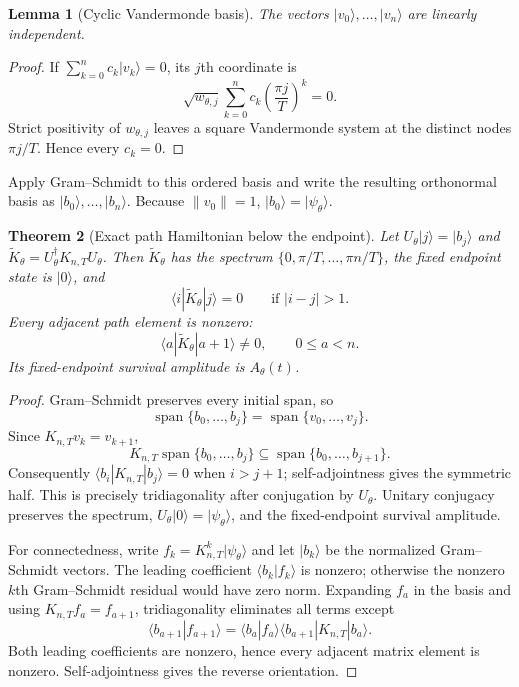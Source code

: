 \documentclass[12pt]{article}
\newtheorem{theorem}{Theorem}[section]
\newtheorem{lemma}[theorem]{Lemma}
\begin{document}
\begin{lemma}[Cyclic Vandermonde basis]
The vectors \(|v_0\rangle,\ldots,|v_n\rangle\) are linearly independent.
\end{lemma}

\begin{proof}
If \(\sum_{k=0}^{n}c_k|v_k\rangle=0\), its \(j\)th coordinate is
\[
 \sqrt{w_{\theta,j}}\sum_{k=0}^{n}
 c_k\left(\frac{\pi j}{T}\right)^k=0.
\]
Strict positivity of \(w_{\theta,j}\) leaves a square Vandermonde system
at the distinct nodes \(\pi j/T\). Hence every \(c_k=0\).
\end{proof}

Apply Gram--Schmidt to this ordered basis and write the resulting
orthonormal basis as \(|b_0\rangle,\ldots,|b_n\rangle\). Because
\(\|v_0\|=1\), \(|b_0\rangle=|\psi_\theta\rangle\).

\begin{theorem}[Exact path Hamiltonian below the endpoint]
Let \(U_\theta|j\rangle=|b_j\rangle\) and
\(\widetilde K_\theta=U_\theta^\dagger K_{n,T}U_\theta\).
Then \(\widetilde K_\theta\) has the spectrum
\(\{0,\pi/T,\ldots,\pi n/T\}\), the fixed endpoint state is
\(|0\rangle\), and
\[
\langle i|\widetilde K_\theta|j\rangle=0
\qquad\text{if }|i-j|>1.
\]
Every adjacent path element is nonzero:
\[
 \langle a|\widetilde K_\theta|a+1\rangle\ne0,
 \qquad 0\leq a<n.
\]
Its fixed-endpoint survival amplitude is \(A_\theta(t)\).
\end{theorem}

\begin{proof}
Gram--Schmidt preserves every initial span, so
\[
\operatorname{span}\{b_0,\ldots,b_j\}
=\operatorname{span}\{v_0,\ldots,v_j\}.
\]
Since \(K_{n,T}v_k=v_{k+1}\),
\[
K_{n,T}\operatorname{span}\{b_0,\ldots,b_j\}
\subseteq\operatorname{span}\{b_0,\ldots,b_{j+1}\}.
\]
Consequently \(\langle b_i|K_{n,T}|b_j\rangle=0\) when
\(i>j+1\); self-adjointness gives the symmetric half. This is precisely
tridiagonality after conjugation by \(U_\theta\). Unitary conjugacy
preserves the spectrum, \(U_\theta|0\rangle=|\psi_\theta\rangle\), and the
fixed-endpoint survival amplitude.

For connectedness, write \(f_k=K_{n,T}^k|\psi_\theta\rangle\) and let
\(|b_k\rangle\) be the normalized Gram--Schmidt vectors. The leading
coefficient \(\langle b_k|f_k\rangle\) is nonzero; otherwise the
nonzero \(k\)th Gram--Schmidt residual would have zero norm. Expanding
\(f_a\) in the basis and using \(K_{n,T}f_a=f_{a+1}\), tridiagonality
eliminates all terms except
\[
 \langle b_{a+1}|f_{a+1}\rangle
 =\langle b_a|f_a\rangle
  \langle b_{a+1}|K_{n,T}|b_a\rangle .
\]
Both leading coefficients are nonzero, hence every adjacent matrix element
is nonzero. Self-adjointness gives the reverse orientation.
\end{proof}
\end{document}
